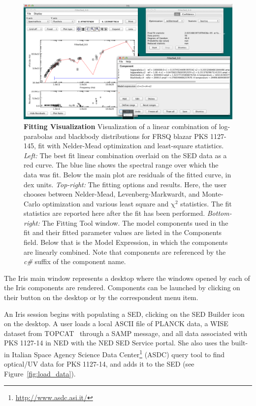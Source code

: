 \documentclass[final,5p,authoryear]{elsarticle}
\begin{document}
\begin{figure} \centering
\includegraphics[height=0.3\textheight]{figures/fitting-1.png}
\caption{\textbf{Fitting Visualization} Visualization of a linear combination of
log-parabolas and blackbody distributions for FRSQ blazar PKS 1127-145, fit with
Nelder-Mead optimization and least-square statistics. \textit{Left:} The best fit
linear combination overlaid on the SED data as a red curve. The blue line shows
the spectral range over which the data was fit. Below the main plot are
residuals of the fitted curve, in dex units. \textit{Top-right:} The fitting
options and results. Here, the user chooses between Nelder-Mead,
Levenberg-Markwardt, and Monte-Carlo \citep[Differential Evolution, ][]{Storn:1997:DEN:596061.596146}
optimization and various least square and
$\mathrm{\chi}^{2}$ statistics. The fit statistics are reported here after the
fit has been performed. \textit{Bottom-right:} The Fitting Tool window. The
model components used in the fit and their fitted parameter values are listed in
the Components field. Below that is the Model Expression, in which the
components are linearly combined. Note that components are referenced by the
\textit{c\#} suffix of the component name.} \label{fig:fitting1} \end{figure}

The Iris main window represents a desktop where the windows opened by each of
the Iris components are rendered. Components can be launched by clicking on
their button on the desktop or by the correspondent menu item.

An Iris session begins with populating a SED, clicking on the SED Builder icon on the
desktop. A user loads a local ASCII file of
PLANCK data, a WISE dataset from TOPCAT~\citep{2005ASPC..347...29T} through a
SAMP message, and all data associated with PKS 1127-14 in NED with the NED SED
Service portal. She also uses the built-in Italian Space Agency Science Data
Center\footnote{\url{http://www.asdc.asi.it/}} (ASDC) query tool to find
optical/UV data for PKS 1127-14, and adds it to the SED (see
Figure~\ref{fig:load_data}).
\end{document}
